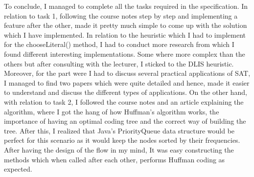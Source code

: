 \documentclass{article}
\begin{document}
		To conclude, I managed to complete all the tasks required in the specification. In relation to task 1, following the course notes step by step and implementing a feature after the other, made it pretty much simple to come up with the solution which I have implemented. In relation to the heuristic which I had to implement for the chooseLiteral() method, I had to conduct more research from which I found different interesting implementations. Some where more complex than the others but after consulting with the lecturer, I sticked to the DLIS heuristic. Moreover, for the part were I had to discuss several practical applications of SAT, I managed to find two papers which were quite detailed and hence, made it easier to understand and discuss the different types of applications. On the other hand, with relation to task 2, I  followed the course notes and an article explaining the algorithm\cite{hc}, where I got the hang of how Huffman's algorithm works, the importance of having an optimal coding tree and the correct way of building the tree. After this, I realized that Java's PriorityQueue data structure would be perfect for this scenario as it would keep the nodes sorted by their frequencies. After having the design of the flow in my mind, It was easy constructing the methods which when called after each other, performs Huffman coding as expected.
					
			
			
		
		\nocite{*}

			
		
			
					
			
\end{document}
